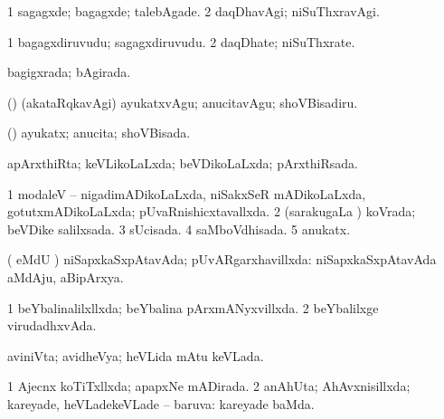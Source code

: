 {\bentry
{} 
\gl{\kirxvi}
\expl{}
\bmng
\bnum
\num{1} sagagxde; bagagxde; talebAgade. 
\num{2} daqDhavAgi; niSuThxravAgi. 
\enum
\emng
\eentry

\bentry
{} 
\gl{\nA}
\expl{}
\bmng
\bnum
\num{1} bagagxdiruvudu; sagagxdiruvudu. 
\num{2} daqDhate; niSuThxrate. 
\enum
\emng
\eentry

\bentry
{} 
\gl{\gu}
\expl{}
\bmng
bagigxrada; bAgirada. 
\emng
\eentry

\bentry
{} 
\gl{\sakirx}
\expl{}
\bmng
(\pArxparx) (akataRqkavAgi) ayukatxvAgu; anucitavAgu; shoVBisadiru. 
\emng
\eentry

\bentry
{} 
\gl{\gu}
\expl{}
\bmng
(\pArxparx) ayukatx; anucita; shoVBisada. 
\emng
\eentry

\bentry
{} 
\gl{\gu}
\expl{}
\bmng
apArxthiRta; keVLikoLaLxda; beVDikoLaLxda; pArxthiRsada. 
\emng
\eentry

\bentry
{} 
\gl{\gu}
\expl{}
\bmng
\bnum
\num{1} modaleV -- nigadimADikoLaLxda, niSakxSeR mADikoLaLxda, gotutxmADikoLaLxda; pUvaRnishicxtavallxda. 
\num{2} (sarakugaLa \vi) koVrada; beVDike salilxsada. 
\num{3} sUcisada. 
\num{4} saMboVdhisada. 
\num{5} anukatx. 
\enum
\emng
\eentry


\bentry
{} 
\gl{\gu}
\expl{}
\bmng
( eMdU \parx) niSapxkaSxpAtavAda; pUvARgarxhavillxda:  niSapxkaSxpAtavAda aMdAju, aBipArxya. 
\emng
\eentry

\bentry
{} 
\gl{\gu}
\expl{}
\bmng
{} 
\emng
\eentry

\bentry
{} 
\gl{\gu}
\expl{}
\bmng
\bnum
\num{1} beYbalinalilxllxda; beYbalina pArxmANyxvillxda. 
\num{2} beYbalilxge virudadhxvAda. 
\enum
\emng
\eentry

\bentry
{} 
\gl{\gu}
\expl{}
\bmng
aviniVta; avidheVya; heVLida mAtu keVLada. 
\emng
\eentry

\bentry
{} 
\gl{\gu}
\expl{}
\bmng
\bnum
\num{1} Ajecnx koTiTxllxda; apapxNe mADirada. 
\num{2} anAhUta; AhAvxnisillxda; kareyade, heVLadekeVLade -- baruva:  kareyade baMda. 
\enum
\emng
\eentry

}

